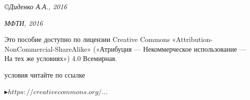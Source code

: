\medskip

\copyright \textsl{Диденко А.А., 2016}

\medspace

\textsl{МФТИ, 2016}


\vspace*{\fill}


\noindent
\begin{minipage}[t]{0.61\textwidth}
\quad\small Это пособие доступно по лицензии Creative Commons «Attribution-NonCommercial-ShareAlike» («Атрибуция — Некоммерческое использование — На тех же условиях») 4.0 Всемирная.

 условия читайте по ссылке

\qquad\href{https://creativecommons.org/licenses/by-nc-sa/4.0/deed.ru}{\textcolor{Purplemountainmajesty}{$\blacktriangleright https://creativecommons.org/...$}}
\end{minipage}%
\hfill%
\begin{minipage}[t]{\dimexpr(0.39\textwidth-2mm)}
\end{minipage}
